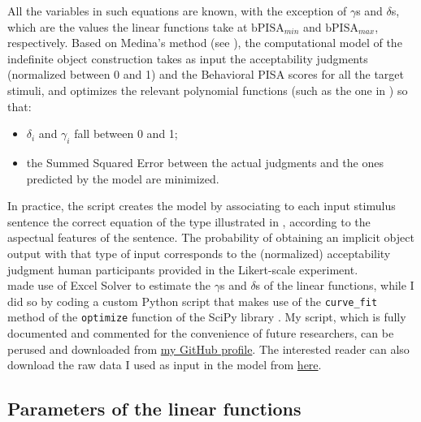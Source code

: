 All the variables in such equations are known, with the exception of $\gamma$s and $\delta$s, which are the values the linear functions take at $\textrm{bPISA}_{min}$ and $\textrm{bPISA}_{max}$, respectively. Based on Medina's method (see ), the computational model of the indefinite object construction takes as input the acceptability judgments (normalized between 0 and 1) and the Behavioral PISA scores for all the target stimuli, and optimizes the relevant polynomial functions (such as the one in ) so that:

\begin{itemize}
    \item $\delta_i$ and $\gamma_i$ fall between 0 and 1;
    \item the Summed Squared Error between the actual judgments and the ones predicted by the model are minimized.
\end{itemize}

In practice, the script creates the model by associating to each input stimulus sentence the correct equation of the type illustrated in , according to the aspectual features of the sentence. The probability of obtaining an implicit object output with that type of input corresponds to the (normalized) acceptability judgment human participants provided in the Likert-scale experiment.\\
\textcite[135]{Medina2007} made use of Excel Solver to estimate the $\gamma$s and $\delta$s of the linear functions, while I did so by coding a custom Python script that makes use of the \texttt{curve\_fit} method of the \texttt{optimize} function of the SciPy library \parencite{2020SciPy-NMeth}. My script, which is fully documented and commented for the convenience of future researchers, can be perused and downloaded from \href{https://github.com/giuliacappelli/MedinaStochasticOptimalityTheory}{my GitHub profile}. The interested reader can also download the raw data I used as input in the model from \href{https://github.com/giuliacappelli/dissertationData}{here}.


\subsection{Parameters of the linear functions} 

